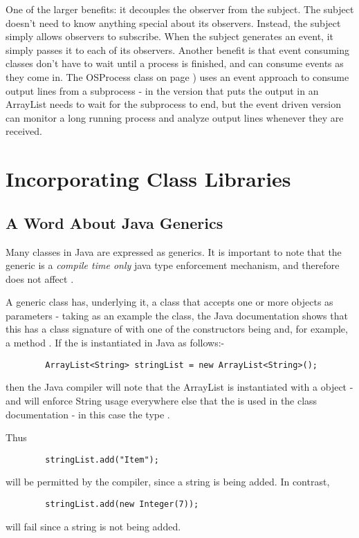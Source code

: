 One of the larger benefits: it decouples the observer from the
subject. The subject doesn't need to know anything special about its
observers. Instead, the subject simply allows observers to
subscribe. When the subject generates an event, it simply passes it to
each of its observers. Another benefit is that event consuming classes
don't have to wait until a process is finished, and can consume events
as they come in. The OSProcess class on page
\pageref{outputeventlistener}) uses an event approach to consume
output lines from a subprocess - in the version that puts the output
in an ArrayList needs to wait for the subprocess to end, but the event
driven version can monitor a long running process and analyze output
lines whenever they are received.

\chapter{Incorporating Class Libraries}
\section{A Word About Java Generics}
Many classes in Java are expressed as generics. It is important to note that the generic is a \emph{compile time only} java type 
enforcement mechanism, and therefore does not affect \nr{}.

A generic class has, underlying it, a class that accepts one or more objects as parameters - taking as an example the  class, the Java documentation shows that this has a class signature of  with one of the constructors being  and, for example, a method .
 If the  is instantiated in Java as follows:-

\begin{verbatim}
		ArrayList<String> stringList = new ArrayList<String>();
\end{verbatim}

then the Java compiler will note that the ArrayList is instantiated with a  object - and will enforce String usage everywhere else that the  is used in the class documentation - in this case the type .

Thus 
\begin{verbatim}
		stringList.add("Item");
\end{verbatim}
will be permitted by the compiler, since a string is being added. In contrast, 
\begin{verbatim}
		stringList.add(new Integer(7));
\end{verbatim}
will fail since a string is not being added.

